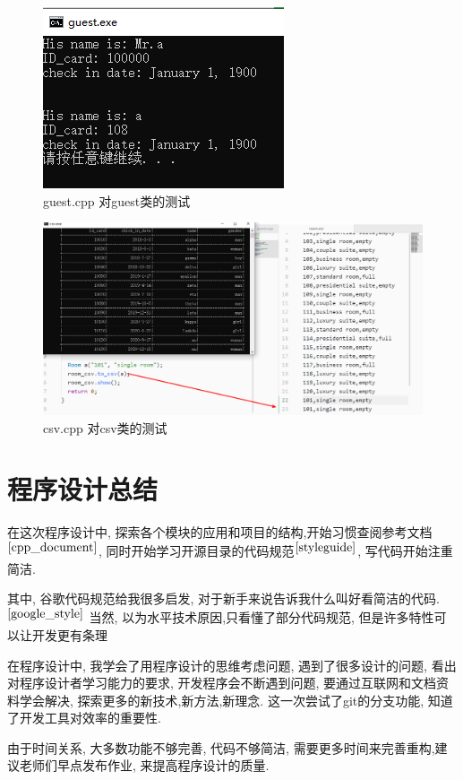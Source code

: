 \documentclass[UTF8]{ctexart}
\begin{document}
  \begin{figure}[H]
      \centering
      \includegraphics[scale=1]{test_guest}
      \caption{guest.cpp 对guest类的测试}
      \label{fig:test_guest}
    \end{figure}
  \begin{figure}[H]
      \centering
      \includegraphics[scale=0.4]{test_csv}
      \caption{csv.cpp 对csv类的测试}
      \label{fig:test_csv}
    \end{figure}
\section{程序设计总结}
  在这次程序设计中, 探索各个模块的应用和项目的结构,开始习惯查阅参考文档$^{\cite{cpp_document}}$, 同时开始学习开源目录的代码规范$^{\cite{styleguide}}$, 写代码开始注重简洁.

  其中, 谷歌代码规范给我很多启发, 对于新手来说告诉我什么叫好看简洁的代码.$^{\cite{google_style}}$
  当然, 以为水平技术原因,只看懂了部分代码规范, 但是许多特性可以让开发更有条理

  在程序设计中, 我学会了用程序设计的思维考虑问题, 遇到了很多设计的问题, 看出对程序设计者学习能力的要求, 开发程序会不断遇到问题, 要通过互联网和文档资料学会解决, 探索更多的新技术,新方法,新理念.
  这一次尝试了git的分支功能, 知道了开发工具对效率的重要性.

  由于时间关系, 大多数功能不够完善, 代码不够简洁, 需要更多时间来完善重构,建议老师们早点发布作业, 来提高程序设计的质量.



\nocite{cpp_primier}%
\end{document}
